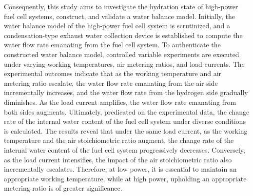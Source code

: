 \par
Consequently, this study aims to investigate the hydration state of high-power fuel cell systems, construct, and validate a water balance model. Initially, the water balance model of the high-power fuel cell system is scrutinized, and a condensation-type exhaust water collection device is established to compute the water flow rate emanating from the fuel cell system. To authenticate the constructed water balance model, controlled variable experiments are executed under varying working temperatures, air metering ratios, and load currents. The experimental outcomes indicate that as the working temperature and air metering ratio escalate, the water flow rate emanating from the air side incrementally increases, and the water flow rate from the hydrogen side gradually diminishes. As the load current amplifies, the water flow rate emanating from both sides augments. Ultimately, predicated on the experimental data, the change rate of the internal water content of the fuel cell system under diverse conditions is calculated. The results reveal that under the same load current, as the working temperature and the air stoichiometric ratio augment, the change rate of the internal water content of the fuel cell system progressively decreases. Conversely, as the load current intensifies, the impact of the air stoichiometric ratio also incrementally escalates. Therefore, at low power, it is essential to maintain an appropriate working temperature, while at high power, upholding an appropriate metering ratio is of greater significance.
